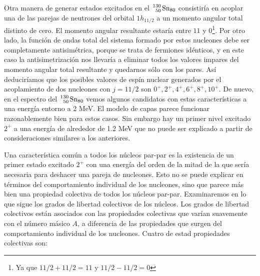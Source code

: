 Otra manera de generar estados excitados en el $\ce{^130_50 Sn_80}$ consistiría en acoplar una de las parejas de neutrones del orbital $1h_{11/2}$ a un momento angular total distinto de cero. El momento angular resultante estaría entre $11$ y $0$\footnote{Ya que $11/2+11/2=11$ y $11/2-11/2=0$}. Por otro lado, la función de ondas total del sistema formado por estos nucleones debe ser completamente antisimétrica, porque se trata de fermiones idénticos, y en este caso la antisimetrización nos llevaría a eliminar todos los valores impares del momento angular total resultante y quedarnos sólo con los pares. Así deduciríamos que los posibles valores de espín nuclear generados por el acoplamiento de dos nucleones con $j=11/2$ son $0^+,2^+,4^+,6^+,8^+,10^+$. De nuevo, en el espectro del $\ce{^130_50 Sn_80}$ vemos algunos candidatos con estas características a una energía entorno a 2 MeV. El modelo de capas parece funcionar razonablemente bien para estos casos. Sin embargo hay un primer nivel excitado $2^+$ a una energía de alrededor de 1.2 MeV que no puede ser explicado a partir de consideraciones similares a los anteriores.

Una característica común a todos los núcleos par-par es la existencia de un primer estado excitado $2^+$ con una energía del orden de la mitad de la que sería necesaria para deshacer una pareja de nucleones. Esto no se puede explicar en términos del comportamiento individual de los nucleones, sino que parece más bien una propiedad colectiva de todos los núcleos par-par. Examinaremos en lo que sigue los grados de libertad colectivos de los núcleos. Los grados de libertad colectivos están asociados con las propiedades colectivas que varían suavemente con el número másico $A$, a diferencia de las propiedades que surgen del comportamiento individual de los nucleones. Cuatro de estad propiedades colectivas son:

